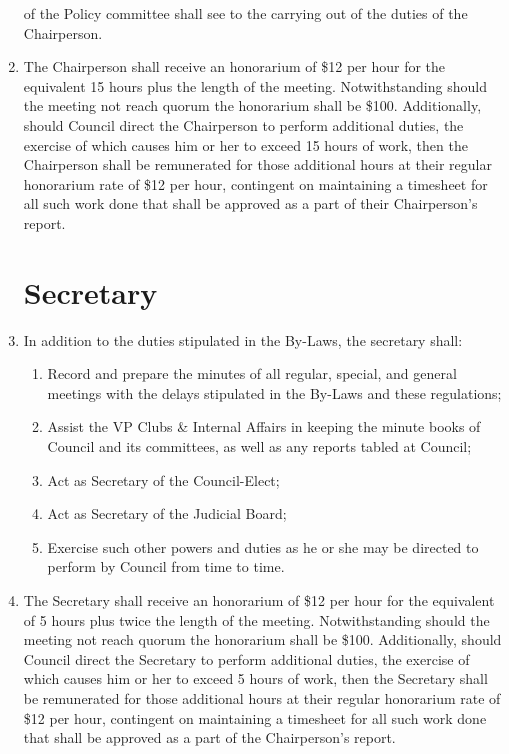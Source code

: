 \documentclass[oneside]{book}
\begin{document}
\begin{enumerate}
of the Policy committee shall see to the carrying out of the duties
of the Chairperson. 
\item The Chairperson shall receive an honorarium of \$12 per hour for the
equivalent 15 hours plus the length of the meeting. Notwithstanding
should the meeting not reach quorum the honorarium shall be \$100. 
Additionally, should Council direct the Chairperson to perform additional duties, 
the exercise of which causes him or her to exceed 15 hours of work, then the 
Chairperson shall be remunerated for those additional hours at their regular 
honorarium rate of \$12 per hour, contingent on maintaining a timesheet for all 
such work done that shall be approved as a part of their Chairperson’s report.

\section{\label{Secretary}Secretary }
\item In addition to the duties stipulated in the By-Laws, the secretary
shall: 

\begin{enumerate}
\item Record and prepare the minutes of all regular, special, and general
meetings with the delays stipulated in the By-Laws and these regulations; 
\item Assist the VP Clubs \& Internal Affairs in keeping the minute books of 
Council and its committees, as well as any reports tabled at Council; 
\item Act as Secretary of the Council-Elect; 
\item Act as Secretary of the Judicial Board;
\item Exercise such other powers and duties as he or she may be directed
to perform by Council from time to time. 
\end{enumerate}
\item The Secretary shall receive an honorarium of \$12 per hour for the
equivalent of 5 hours plus twice the length of the meeting. Notwithstanding
should the meeting not reach quorum the honorarium shall be \$100. Additionally, 
should Council direct the Secretary to perform additional duties, the exercise 
of which causes him or her to exceed 5 hours of work, then the Secretary shall 
be remunerated for those additional hours at their regular honorarium rate of 
\$12 per hour, contingent on maintaining a timesheet for all such work done that 
shall be approved as a part of the Chairperson’s report.


\end{enumerate}
\end{document}
